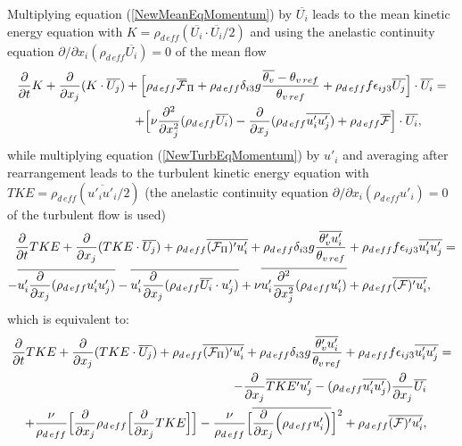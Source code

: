 Multiplying equation (\ref{NewMeanEqMomentum}) by $\overline{U_i}$ leads to the
mean kinetic energy equation with 
$K=\rho_{d\,eff} (\overline{U_i} \cdot \overline{U_i}/2)$
and using the anelastic continuity equation 
$\partial/\partial x_i (\rho_{d\,eff} \overline{U_i})=0$ of the mean flow
\begin{eqnarray}
\label{NewMeanEqKenergy}
\dfrac{\partial}{\partial t} K
+\dfrac{\partial}{\partial x_j} (K \cdot \overline{U_j} )
+ \Big[\rho_{d\,eff} \overline{\cal F}_{\Pi}
+ \rho_{d\,eff}  \delta_{i3} g \dfrac{\overline{\theta_v}-\theta_{v\,ref}}{\theta_{v\,ref}}
+ \rho_{d\,eff} f \epsilon_{ij3} \overline{U_j} \Big] \cdot \overline{U_i} = & \nonumber\\
+\Big[\nu \dfrac{\partial^2}{\partial x_j^2} (\rho_{d\,eff} \overline{U_i}) -\dfrac{\partial}{\partial x_j} (\rho_{d\,eff} \overline{u'_i u'_j})               
+ \rho_{d\,eff} \overline{\cal F} \Big] \cdot \overline{U_i} , \qquad &
\end{eqnarray}
\noindent while multiplying equation (\ref{NewTurbEqMomentum}) by $u'_i$ and 
averaging after rearrangement leads to the turbulent kinetic energy equation 
with $TKE=\rho_{d\,eff} (\overline{u'_iu'_i}/2)$ (the anelastic continuity 
equation 
$\partial/\partial x_i (\rho_{d\,eff} {u'_i})=0$ of the turbulent flow is 
used)
\begin{eqnarray}
\label{NewTurbEqTKE}
\dfrac{\partial}{\partial t} TKE
+\dfrac{\partial}{\partial x_j} (TKE \cdot \overline{U_j} )
+ \rho_{d\,eff} \overline{({\cal F}_{\Pi})'u'_i}
+ \rho_{d\,eff}  \delta_{i3} g \dfrac{\overline{\theta'_v u'_i}}{\theta_{v\,ref}}
+ \rho_{d\,eff} f \epsilon_{ij3} \overline{u'_i u'_j} = & \nonumber\\
- \overline{u'_i\dfrac{\partial}{\partial x_j} (\rho_{d\,eff} u'_i u'_j)} 
- \overline{u'_i \dfrac{\partial}{\partial x_j} (\rho_{d\,eff} \overline{U_i} \cdot {u'_j} )}
+ \nu \overline{u'_i \dfrac{\partial^2}{\partial x_j^2} (\rho_{d\,eff} {u'_i})} 
+ \rho_{d\,eff} \overline{({\cal F})' u'_i} , \qquad &
\end{eqnarray}
\noindent which is equivalent to:
\begin{eqnarray}
\label{NewNewTurbEqTKE}
\dfrac{\partial}{\partial t} TKE
+\dfrac{\partial}{\partial x_j} (TKE \cdot \overline{U_j} )
+ \rho_{d\,eff} \overline{({\cal F}_{\Pi})'u'_i}
+ \rho_{d\,eff}  \delta_{i3} g \dfrac{\overline{\theta'_v u'_i}}{\theta_{v\,ref}}
+ \rho_{d\,eff} f \epsilon_{ij3} \overline{u'_i u'_j} = & \nonumber\\
- \dfrac{\partial}{\partial x_j} \overline{TKE' u'_j}
- (\rho_{d\,eff} \overline{u'_i u'_j}) \dfrac{\partial}{\partial x_j} \overline{U_i} 
\qquad  & \nonumber\\
+ \dfrac{\nu}{\rho_{d\,eff}} \Big[ \dfrac{\partial}{\partial x_j} \rho_{d\,eff} \Big[ \dfrac{\partial}{\partial x_j} TKE\Big] \Big]
- \dfrac{\nu}{\rho_{d\,eff}} \Big[ \overline{\dfrac{\partial}{\partial x_j} \Big( \rho_{d\,eff} u'_i\Big)} \Big]^2
+ \rho_{d\,eff} \overline{({\cal F})' u'_i} , \qquad &
\end{eqnarray}
